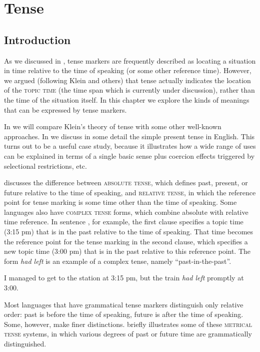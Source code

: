 \chapter{Tense}\label{sec:21}

\section{Introduction}\label{sec:21.1}

As we discussed in , tense markers are frequently described as locating a situation in time relative to the time of speaking (or some other reference time). However, we argued (following Klein and others) that tense actually indicates the location of the \textsc{topic time} (the time span which is currently under discussion), rather than the time of the situation itself. In this chapter we explore the kinds of meanings that can be expressed by tense markers.



In  we will compare Klein’s theory of tense with some other well-known approaches. In  we discuss in some detail the simple present tense in English. This turns out to be a useful case study, because it illustrates how a wide range of uses can be explained in terms of a single basic sense plus coercion effects triggered by selectional restrictions, etc.



 discusses the difference between \textsc{absolute tense}, which defines past, present, or future relative to the time of speaking, and \textsc{relative tense}, in which the reference point for tense marking is some time other than the time of speaking. Some languages also have \textsc{complex tense} forms, which combine absolute with relative time reference. In sentence , for example, the first clause specifies a topic time (3:15 pm) that is in the past relative to the time of speaking. That time becomes the reference point for the tense marking in the second clause, which specifies a new topic time (3:00 pm) that is in the past relative to this reference point. The form \textit{had left} is an example of a complex tense, namely “past-in-the-past”.


\ea \label{ex:21.1}
I managed to get to the station at 3:15 pm, but the train \textit{had left} promptly at 3:00.
\z


Most languages that have grammatical tense markers distinguish only relative order: past is before the time of speaking, future is after the time of speaking. Some, however, make finer distinctions.  briefly illustrates some of these \textsc{metrical tense} systems, in which various degrees of past or future time are grammatically distinguished. 



